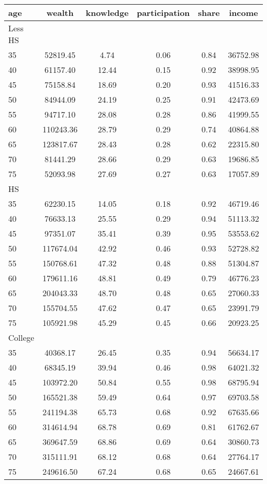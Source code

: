  \begin{tabular}{lccccc}
 \hline \hline
  age & wealth & knowledge & participation & share & income \\
 \hline
 Less HS & & & & & \\
 \hline
35 &  52819.45 &      4.74 &      0.06 &      0.84 &  36752.98 \\ 
40 &  61157.40 &     12.44 &      0.15 &      0.92 &  38998.95 \\ 
45 &  75158.84 &     18.69 &      0.20 &      0.93 &  41516.33 \\ 
50 &  84944.09 &     24.19 &      0.25 &      0.91 &  42473.69 \\ 
55 &  94717.10 &     28.08 &      0.28 &      0.86 &  41999.55 \\ 
60 & 110243.36 &     28.79 &      0.29 &      0.74 &  40864.88 \\ 
65 & 123817.67 &     28.43 &      0.28 &      0.62 &  22315.80 \\ 
70 &  81441.29 &     28.66 &      0.29 &      0.63 &  19686.85 \\ 
75 &  52093.98 &     27.69 &      0.27 &      0.63 &  17057.89 \\ 
 \hline
 HS & & & & & \\
 \hline
35 &  62230.15 &     14.05 &      0.18 &      0.92 &  46719.46 \\ 
40 &  76633.13 &     25.55 &      0.29 &      0.94 &  51113.32 \\ 
45 &  97351.07 &     35.41 &      0.39 &      0.95 &  53553.62 \\ 
50 & 117674.04 &     42.92 &      0.46 &      0.93 &  52728.82 \\ 
55 & 150768.61 &     47.32 &      0.48 &      0.88 &  51304.87 \\ 
60 & 179611.16 &     48.81 &      0.49 &      0.79 &  46776.23 \\ 
65 & 204043.33 &     48.70 &      0.48 &      0.65 &  27060.33 \\ 
70 & 155704.55 &     47.62 &      0.47 &      0.65 &  23991.79 \\ 
75 & 105921.98 &     45.29 &      0.45 &      0.66 &  20923.25 \\ 
 \hline
 College & & & & & \\
 \hline
35 &  40368.17 &     26.45 &      0.35 &      0.94 &  56634.17 \\ 
40 &  68345.19 &     39.94 &      0.46 &      0.98 &  64021.32 \\ 
45 & 103972.20 &     50.84 &      0.55 &      0.98 &  68795.94 \\ 
50 & 165521.38 &     59.49 &      0.64 &      0.97 &  69703.58 \\ 
55 & 241194.38 &     65.73 &      0.68 &      0.92 &  67635.66 \\ 
60 & 314614.94 &     68.78 &      0.69 &      0.81 &  61762.67 \\ 
65 & 369647.59 &     68.86 &      0.69 &      0.64 &  30860.73 \\ 
70 & 315111.91 &     68.12 &      0.68 &      0.64 &  27764.17 \\ 
75 & 249616.50 &     67.24 &      0.68 &      0.65 &  24667.61 \\ 
 \hline \hline
 \end{tabular}
